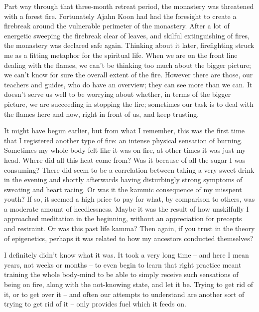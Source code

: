 Part way through that three-month retreat period, the monastery was
threatened with a forest fire. Fortunately Ajahn Koon had had the
foresight to create a firebreak around the vulnerable perimeter of the
monastery. After a lot of energetic sweeping the firebreak clear of
leaves, and skilful extinguishing of fires, the monastery was declared
safe again. Thinking about it later, firefighting struck me as a fitting
metaphor for the spiritual life. When we are on the front line dealing
with the flames, we can't be thinking too much about the bigger picture;
we can't know for sure the overall extent of the fire. However there are
those, our teachers and guides, who do have an overview; they can see
more than we can. It doesn't serve us well to be worrying about whether,
in terms of the bigger picture, we are succeeding in stopping the fire;
sometimes our task is to deal with the flames here and now, right in
front of us, and keep trusting.

It might have begun earlier, but from what I remember, this was the
first time that I registered another type of fire: an intense physical
sensation of burning. Sometimes my whole body felt like it was on fire,
at other times it was just my head. Where did all this heat come from?
Was it because of all the sugar I was consuming? There did seem to be a
correlation between taking a very sweet drink in the evening and shortly
afterwards having disturbingly strong symptoms of sweating and heart
racing. Or was it the kammic consequence of my misspent youth? If so, it
seemed a high price to pay for what, by comparison to others, was a
moderate amount of heedlessness. Maybe it was the result of how
unskilfully I approached meditation in the beginning, without an
appreciation for precepts and restraint. Or was this past life kamma?
Then again, if you trust in the theory of epigenetics\cite{epigenetics},
perhaps it was related to how my ancestors conducted themselves?

I definitely didn't know what it was. It took a very long time -- and
here I mean years, not weeks or months -- to even begin to learn that
right practice meant training the whole body-mind to be able to simply
receive such sensations of being on fire, along with the not-knowing
state, and let it be. Trying to get rid of it, or to get over it -- and
often our attempts to understand are another sort of trying to get rid
of it -- only provides fuel which it feeds on.

